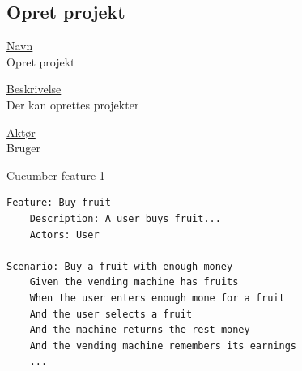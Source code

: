\subsection{Opret projekt}
\underline{Navn} \\
Opret projekt

\underline{Beskrivelse} \\
Der kan oprettes projekter

\underline{Aktør} \\
Bruger


\underline{Cucumber feature 1}
\begin{verbatim}
Feature: Buy fruit
    Description: A user buys fruit...
    Actors: User

Scenario: Buy a fruit with enough money
    Given the vending machine has fruits
    When the user enters enough mone for a fruit
    And the user selects a fruit
    And the machine returns the rest money
    And the vending machine remembers its earnings
    ...
\end{verbatim}